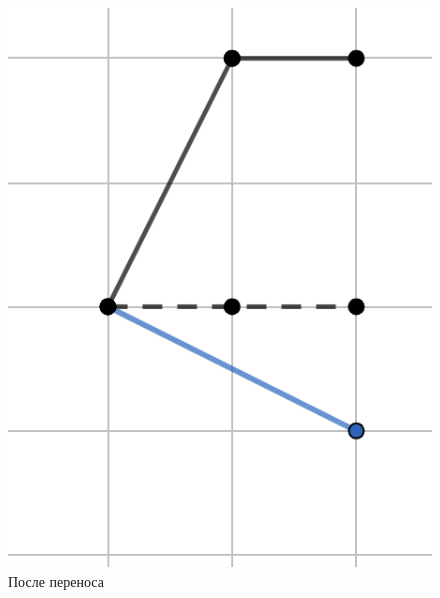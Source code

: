\documentclass[fontsize=14pt]{scrartcl}
\theoremstyle{definition}
\begin{document}
\begin{figure}[!htb]
  \includegraphics[width=\linewidth]{translate.png}
  \caption{После переноса}\label{fig:awesome_image1}
\endminipage\hfill
{}

\end{figure}
\end{document}
